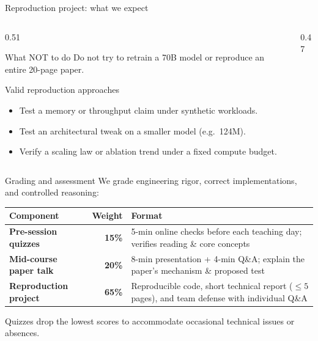 \documentclass[handout]{beamer}
\begin{document}
\begin{frame}{Reproduction project: what we expect}
  \begin{columns}[c]
    \begin{column}{0.51\linewidth}
      \begin{alertblock}{What NOT to do}
        Do not try to retrain a 70B model or reproduce an entire 20-page paper.
      \end{alertblock}
      \vspace{4pt}
      \begin{block}{Valid reproduction approaches}
        \begin{itemize}
            \setlength{\itemsep}{4pt}
          \item Test a memory or throughput claim under synthetic workloads.
          \item Test an architectural tweak on a smaller model (e.g.~124M).
          \item Verify a scaling law or ablation trend under a fixed compute budget.
        \end{itemize}
      \end{block}
    \end{column}
    \begin{column}{0.47\linewidth}
      \vspace{6pt}
    \end{column}
  \end{columns}
\end{frame}

\begin{frame}{Grading and assessment}
  We grade engineering rigor, correct implementations, and controlled reasoning:
  \vfill
  \centering\small
  \begin{tabular}{lrp{5.2cm}}
    \toprule
    Component & Weight & Format \\
    \midrule
    \textbf{Pre-session quizzes} & \textbf{15\%} & 5-min online checks before each teaching day; verifies reading \& core concepts \\
    \addlinespace[4pt]
    \textbf{Mid-course paper talk} & \textbf{20\%} & 8-min presentation + 4-min Q\&A; explain the paper's mechanism \& proposed test \\
    \addlinespace[4pt]
    \textbf{Reproduction project} & \textbf{65\%} & Reproducible code, short technical report ($\le 5$ pages), and team defense with individual Q\&A \\
    \bottomrule
  \end{tabular}
  \vfill
  \raggedright\scriptsize Quizzes drop the lowest scores to accommodate occasional technical issues or absences.
\end{frame}
\end{document}
